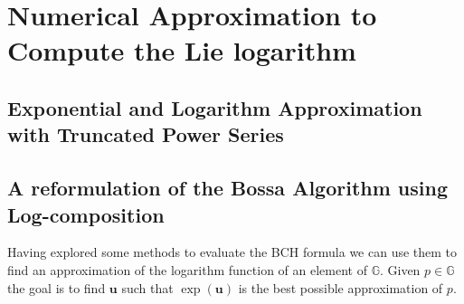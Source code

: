 \chapter{Numerical Approximation to Compute the Lie logarithm}\label{ch:lie_log_computation}


\section{Exponential and Logarithm Approximation with Truncated Power Series}



\section{A reformulation of the Bossa Algorithm using Log-composition}



Having explored some methods to evaluate the BCH formula we can use them to find an approximation of the logarithm function of an element of $\mathbb{G}$. 
Given $p \in \mathbb{G}$ the goal is to find $\mathbf{u}$ such that $\exp(\mathbf{u})$ is the best possible approximation of $p$.  

